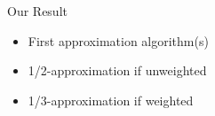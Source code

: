 \begin{frame}{Our Result}
\begin{itemize}
  \item<1> First approximation algorithm(s) 
  \item<2> 1/2-approximation if unweighted
  \item<3> 1/3-approximation if weighted
\end{itemize}
\end{frame}